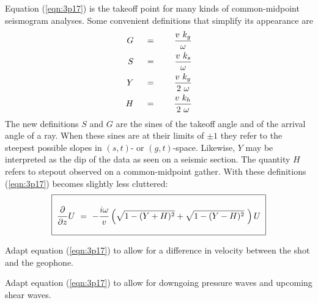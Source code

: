 Equation (\ref{eqn:3p17}) is the takeoff point
for many kinds of common-midpoint seismogram analyses.
Some convenient definitions that simplify its appearance are
\begin{eqnarray}
G\ \ \ \ &=&\ \ \ \  { v\ k_g   \over \omega }
\label{eqn:3p18a}
\\
S\ \ \ \ &=&\ \ \ \ { v\ k_s   \over \omega }
\label{eqn:3p18b}
\\
Y\ \ \ \ &=&\ \ \ \ { v\ k_y   \over  2\ \omega }
\label{eqn:3p18c}
\\
H\ \ \ \ &=&\ \ \ \ { v\ k_h   \over  2\ \omega }
\label{eqn:3p18d}
\end{eqnarray}
The new definitions  $S$  and  $G$  are the sines
of the takeoff angle and of the arrival angle of a ray.
When these sines are at their limits of  $ \pm 1 $  they refer
to the steepest possible slopes in $(s,t)$- or $(g,t)$-space.
Likewise, $Y$ may be interpreted as the dip of the data as seen
on a seismic section.
The quantity  $H$  refers to stepout observed on a common-midpoint gather.
With these definitions (\ref{eqn:3p17}) becomes slightly less cluttered:
\begin{equation}
\begin{tabular}{|c|}  \hline
 \\  $\displaystyle {\strut\partial\over\partial z}U
      \ =\ -\displaystyle {\strut i\omega\over v} 
                    \left(\sqrt{1-(Y+H)^2} +
 \sqrt{1-(Y-H)^2} \ \right) U$  \\
 \\    \hline
\end{tabular}
\label{eqn:3p19}
\end{equation}


\begin{exer}

\item
Adapt equation (\ref{eqn:3p17}) to allow for a difference in velocity
between the shot and the geophone.
\item
Adapt equation (\ref{eqn:3p17}) to allow for downgoing pressure waves
and upcoming shear waves.
\end{exer}


